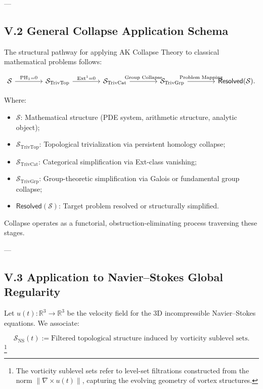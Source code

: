 \documentclass[11pt]{article}
\begin{document}
---

\subsection*{V.2 General Collapse Application Schema}

The structural pathway for applying AK Collapse Theory to classical mathematical problems follows:

\[
\begin{tikzcd}[column sep=4em]
\mathcal{S} \arrow[r, "\mathrm{PH}_1 = 0"]
& \mathcal{S}_{\mathrm{TrivTop}} \arrow[r, "\mathrm{Ext}^1 = 0"]
& \mathcal{S}_{\mathrm{TrivCat}} \arrow[r, "\text{Group Collapse}"]
& \mathcal{S}_{\mathrm{TrivGrp}} \arrow[r, "\text{Problem Mapping}"]
& \mathsf{Resolved}(\mathcal{S}).
\end{tikzcd}
\]

Where:
\begin{itemize}
    \item $\mathcal{S}$: Mathematical structure (PDE system, arithmetic structure, analytic object);
    \item $\mathcal{S}_{\mathrm{TrivTop}}$: Topological trivialization via persistent homology collapse;
    \item $\mathcal{S}_{\mathrm{TrivCat}}$: Categorical simplification via Ext-class vanishing;
    \item $\mathcal{S}_{\mathrm{TrivGrp}}$: Group-theoretic simplification via Galois or fundamental group collapse;
    \item $\mathsf{Resolved}(\mathcal{S})$: Target problem resolved or structurally simplified.
\end{itemize}

Collapse operates as a functorial, obstruction-eliminating process traversing these stages.

---

\subsection*{V.3 Application to Navier–Stokes Global Regularity}

Let $u(t) : \mathbb{R}^3 \to \mathbb{R}^3$ be the velocity field for the 3D incompressible Navier–Stokes equations.  
We associate:

\[
\mathcal{S}_{\mathrm{NS}}(t) := \text{Filtered topological structure induced by vorticity sublevel sets}.
\]
\footnote{The vorticity sublevel sets refer to level-set filtrations constructed from the norm $\|\nabla \times u(t)\|$, capturing the evolving geometry of vortex structures.}
\end{document}
